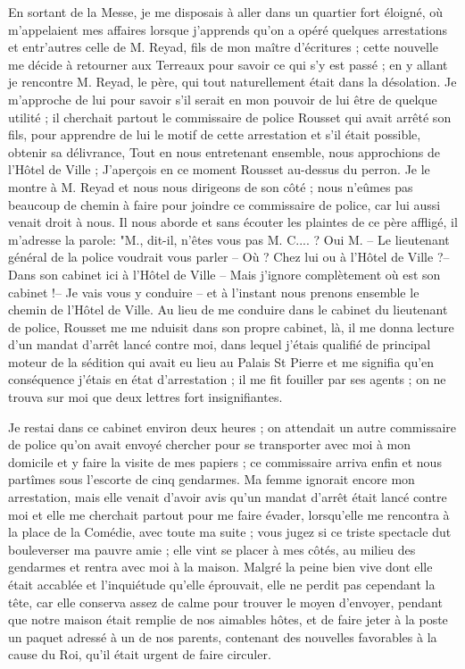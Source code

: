 \documentclass[11pt,a4paper]{report}
\begin{document}
En sortant de la Messe, je me disposais à aller dans un quartier fort éloigné, où m'appelaient mes affaires lorsque j'apprends qu'on a opéré quelques arrestations et entr'autres celle de M. Reyad, fils de mon maître d'écritures ; cette nouvelle me décide à retourner aux Terreaux pour savoir ce qui s'y est passé ; en y allant je rencontre M. Reyad, le père, qui tout naturellement était dans la désolation. Je m'approche de lui pour savoir s'il serait en mon pouvoir de lui être de quelque utilité ; il cherchait partout le commissaire de police Rousset qui avait arrêté son fils, pour apprendre de lui le motif de cette arrestation et s'il était possible, obtenir sa délivrance, Tout en nous entretenant ensemble, nous approchions de l'Hôtel de Ville ; J'aperçois en ce moment Rousset au-dessus du perron. Je le montre à M. Reyad et nous nous dirigeons de son côté ; nous n'eûmes pas beaucoup de chemin à faire pour joindre ce commissaire de police, car lui aussi venait droit à nous. Il nous aborde et sans écouter les plaintes de ce père affligé, il m'adresse la parole: "M., dit-il, n'êtes vous pas M. C.... ? Oui M. -- Le lieutenant général de la police voudrait vous parler -- Où ? Chez lui ou à l'Hôtel de Ville ?-- Dans son cabinet ici à l'Hôtel de Ville -- Mais j'ignore complètement où est son cabinet !-- Je vais vous y conduire -- et à l'instant nous prenons ensemble le chemin de l'Hôtel de Ville. Au lieu de me conduire dans le cabinet du lieutenant de police, Rousset me me nduisit dans son propre cabinet, là, il me donna lecture d'un mandat d'arrêt lancé contre moi, dans lequel j'étais qualifié de principal moteur de la sédition qui avait eu lieu au Palais St Pierre et me signifia qu'en conséquence j'étais en état d'arrestation ; il me fit fouiller par ses agents ; on ne trouva sur moi que deux lettres fort insignifiantes.

Je restai dans ce cabinet environ deux heures ; on attendait un autre commissaire de police qu'on avait envoyé chercher pour se transporter avec moi à mon domicile et y faire la visite de mes papiers ; ce commissaire arriva enfin et nous partîmes sous l'escorte de cinq gendarmes. Ma femme ignorait encore mon arrestation, mais elle venait d'avoir avis qu'un mandat d'arrêt était lancé contre moi et elle me cherchait partout pour me faire évader, lorsqu'elle me rencontra à la place de la Comédie, avec toute ma suite ; vous jugez si ce triste spectacle dut bouleverser ma pauvre amie ; elle vint se placer à mes côtés, au milieu des gendarmes et rentra avec moi à la maison. Malgré la peine bien vive dont elle était accablée et l'inquiétude qu'elle éprouvait, elle ne perdit pas cependant la tête, car elle conserva assez de calme pour trouver le moyen d'envoyer, pendant que notre maison était remplie de nos aimables hôtes, et de faire jeter à la poste un paquet adressé à un de nos parents, contenant des nouvelles favorables à la cause du Roi, qu'il était urgent de faire circuler.
\end{document}
